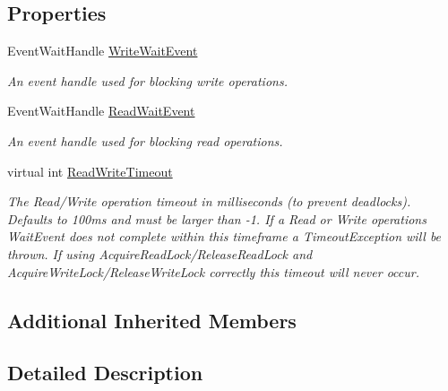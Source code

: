 \subsection*{Properties}
\begin{DoxyCompactItemize}
\item 
Event\+Wait\+Handle \hyperlink{class_shared_memory_1_1_buffer_with_locks_a5d7e21579a5af649e828e3a4e70f67e8}{Write\+Wait\+Event}
\begin{DoxyCompactList}\small\item\em An event handle used for blocking write operations. \end{DoxyCompactList}\item 
Event\+Wait\+Handle \hyperlink{class_shared_memory_1_1_buffer_with_locks_a93181710ceef6b88e2d7647f976f1e79}{Read\+Wait\+Event}
\begin{DoxyCompactList}\small\item\em An event handle used for blocking read operations. \end{DoxyCompactList}\item 
virtual int \hyperlink{class_shared_memory_1_1_buffer_with_locks_a5c1d09ad6c8629a8a8b7f2e5eca12e69}{Read\+Write\+Timeout}
\begin{DoxyCompactList}\small\item\em The Read/\+Write operation timeout in milliseconds (to prevent deadlocks). Defaults to 100ms and must be larger than -\/1. If a Read or Write operation\textquotesingle{}s Wait\+Event does not complete within this timeframe a Timeout\+Exception will be thrown. If using Acquire\+Read\+Lock/\+Release\+Read\+Lock and Acquire\+Write\+Lock/\+Release\+Write\+Lock correctly this timeout will never occur. \end{DoxyCompactList}\end{DoxyCompactItemize}
\subsection*{Additional Inherited Members}


\subsection{Detailed Description}


